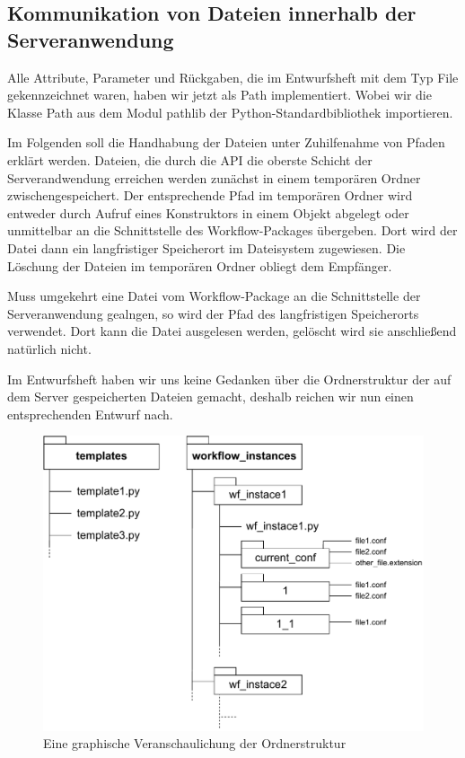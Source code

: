 \subsection{Kommunikation von Dateien innerhalb der Serveranwendung}
Alle Attribute, Parameter und Rückgaben, die im Entwurfsheft mit dem Typ \glqq File\grqq{} gekennzeichnet waren, haben wir jetzt als Path implementiert. Wobei wir die Klasse Path aus dem Modul pathlib der Python-Standardbibliothek importieren.

Im Folgenden soll die Handhabung der Dateien unter Zuhilfenahme von Pfaden erklärt werden. Dateien, die durch die API die oberste Schicht der Serverandwendung erreichen werden zunächst in einem temporären Ordner zwischengespeichert. Der entsprechende Pfad im temporären Ordner wird entweder durch Aufruf eines Konstruktors in einem Objekt abgelegt oder unmittelbar an die Schnittstelle des Workflow-Packages übergeben.
Dort wird der Datei dann ein langfristiger Speicherort im Dateisystem zugewiesen. Die Löschung der Dateien im temporären Ordner obliegt dem Empfänger. 

Muss umgekehrt eine Datei vom Workflow-Package an die Schnittstelle der Serveranwendung gealngen, so wird der Pfad des langfristigen Speicherorts verwendet. Dort kann die Datei ausgelesen werden, gelöscht wird sie anschließend natürlich nicht.

Im Entwurfsheft haben wir uns keine Gedanken über die Ordnerstruktur der auf dem Server gespeicherten Dateien gemacht, deshalb reichen wir nun einen entsprechenden Entwurf nach. 

\begin{figure}[h]
            \label{ordnerstruktur}
            \centerline{\includegraphics[scale=0.7]{res/ordnerstruktur.pdf}}
            \caption{Eine graphische Veranschaulichung der Ordnerstruktur}
\end{figure}

